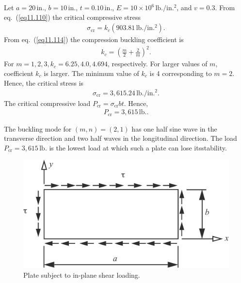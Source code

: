 \documentclass{AeroStructure-ERJohnson}
\begin{document}
\begin{example}\label{ex11.4}%
Let $a=20$\,in., $b=10$\,in., $t=0.10$\,in., $E=10 \times 10^{6}\,\textrm{lb}./\mathrm{in}.^{2}$, and $v=0.3$. From eq.~(\ref{eq11.110}) the critical compressive stress
\begin{align}
\sigma_{\mathrm{cr}}=k_{c}(903.81\,\textrm{lb}./\mathrm{in.}^{2}). \label{eq11.4.a}\tag{a}
\end{align}
From eq.~(\ref{eq11.114}) the compression buckling coefficient is
\begin{align}
k_{c}=\left(\frac{m}{2}+\frac{2}{m}\right)^{2}. \label{eq11.4.b}\tag{b}
\end{align}
For $m= 1, 2, 3, k_{c}=6.25,4.0,4.694$, respectively. For larger values of $m$, coefficient $k_{c}$ is larger. The minimum value of $k_{c}$ is 4 corresponding to $m=2$. Hence, the critical stress is
\begin{align}
\sigma_{\mathrm{cr}}=3,615.24\,\textrm{lb}./\mathrm{in.}^{2}. \label{eq11.4.c}\tag{c}
\end{align}
The critical compressive load $P_{\mathrm{cr}}=\sigma_{\mathrm{cr}} bt$. Hence,
\begin{align}
P_{\mathrm{cr}}=3{,}615\,\textrm{lb.}. \label{eq11.4.d}\tag{d}
\end{align}

\vspace*{-1pc}

The buckling mode for $(m, n)=(2,1)$ has one half sine wave in the transverse direction and two half waves in the longitudinal direction. The load $P_{\mathrm{cr}}=3{,}615\,\textrm{lb.}$ is the lowest load at which such a plate can lose its\break stability.
\end{example}

\begin{figure}[!b]
\centerline{\includegraphics{Figure_11-28.pdf}}
\caption{Plate subject to in-plane shear loading.} \label{fig11.28}\vspace*{8pt}
\end{figure}
\end{document}
